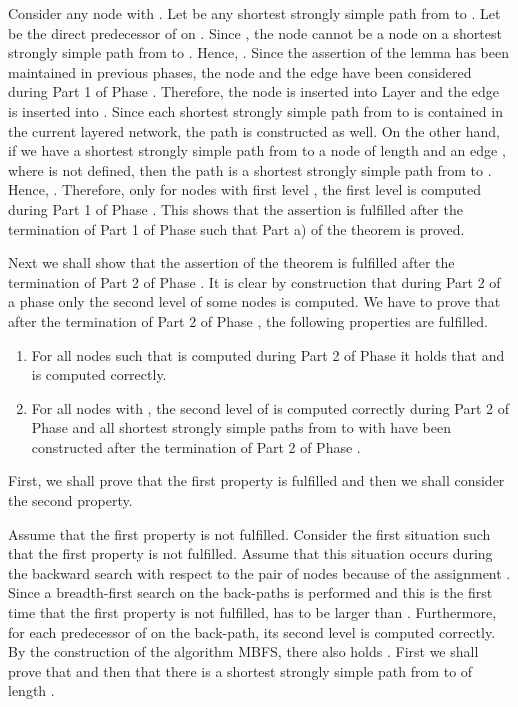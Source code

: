 \documentclass[12pt,twoside,a4paper]{article}
\begin{document}
Consider any node  with . Let  be any shortest 
strongly simple path from  to . Let  be the direct predecessor of  
on . Since , the node  cannot be a node on a shortest 
strongly simple path from  to . Hence, .
Since the assertion of the lemma has been maintained in previous phases, the node 
and the edge  have been considered during Part 1 of Phase . Therefore,
the node  is inserted into Layer  and the edge  is inserted into 
. Since each shortest strongly simple path from  to  is contained in the 
current layered network, the path  is constructed as well.
On the other hand, if we have a shortest strongly simple path  from  to a node  
of length  and
an edge , where  is not defined, then the path  is a shortest
strongly simple path from  to . Hence, . Therefore, only for nodes 
with first level , the first level is computed during Part 1 of Phase . 
This shows that the assertion is fulfilled after the termination of Part 1 of Phase 
such that Part a) of the theorem is proved.

\medskip
Next we shall show that the assertion of the theorem is fulfilled after the termination
of Part 2 of Phase . It is clear by construction that during Part 2 of a phase only 
the second level of some nodes is computed. We have to prove that after the termination 
of Part 2 of Phase , the following properties are fulfilled.
\begin{enumerate}
\item
For all nodes  such that  is computed during Part 2 of Phase  
it holds that  and  is computed
correctly.
\item
For all nodes  with , 
the second level of  is computed correctly during Part 2 of Phase  and
all shortest strongly simple paths from  to  with  have
been constructed after the termination of Part 2 of Phase .
\end{enumerate}
First, we shall prove that the first property is fulfilled and then we shall consider the
second property. 

\medskip
Assume that the first property is not fulfilled. Consider the first situation such that
the first property is not fulfilled. Assume that this situation occurs during the backward 
search with respect to the pair  of nodes because of the assignment 
. Since a breadth-first search on the back-paths is performed and this is 
the first time that the first property is not fulfilled,  has to be larger than 
. Furthermore, for each predecessor of  on the back-path, its second level is computed
correctly. 
By the construction of the algorithm MBFS, there also holds .
First we shall prove that  and then that 
there is a shortest strongly simple path from  to  of length .
\end{document}
